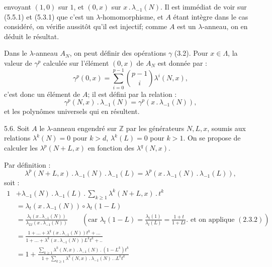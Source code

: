 
envoyant \((1,0)\) sur \(1\), et \((0,x)\) sur \(x\mathbin{.}\lambda_{-1}(N)\). Il est immédiat de voir sur (5.5.1) et (5.3.1) que c'est un \(\lambda\)-homomorphisme, et \(A\) étant intègre dans le cas considéré, on vérifie aussitôt qu'il est injectif; comme \(A\) est un \(\lambda\)-anneau, on en déduit le résultat.

Dans le \(\lambda\)-anneau \(A_N\), on peut définir des opérations \(\gamma\) (3.2). Pour \(x\in\Lambda\), la valeur de \(\gamma^p\) calculée sur l'élément \((0,x)\) de \(A_N\) est donnée par :
\[
  \gamma^p(0,x)=\sum_{i=0}^{p-1}\binom{p-1}{i}\lambda^i(N,x),
\]
c'est donc un élément de \(A\); il est défini par la relation :
\begin{equation}\tag{5.5.4}
  \gamma^p(N,x)\mathbin{.}\lambda_{-1}(N)=\gamma^p(x\mathbin{.}\lambda_{-1}(N)),
\end{equation}
et les polynômes universels qui en résultent.


5.6. Soit \(A\) le \(\lambda\)-anneau engendré sur \(\mathbb Z\) par les générateurs \(N,L,x\), soumis aux relations \(\lambda^k(N)=0\) pour \(k>d\), \(\lambda^k(L)=0\) pour \(k>1\). On se propose de calculer les \(\lambda^p(N+L,x)\) en fonction des \(\lambda^q(N,x)\).

Par définition :
\[
  \lambda^p(N+L,x)\mathbin{.}\lambda_{-1}(N)\mathbin{.}\lambda_{-1}(L)
  =\lambda^p(x\mathbin{.}\lambda_{-1}(N)\mathbin{.}\lambda_{-1}(L)),
\]
soit :
\[
\begin{aligned}
1&+\lambda_{-1}(N)\mathbin{.}\lambda_{-1}(L)\mathbin{.}\sum_{k\ge1}\lambda^k(N+L,x)\mathbin{.} t^k \\
 &=\lambda_t(x\mathbin{.}\lambda_{-1}(N))\circ \lambda_t(1-L) \\
 &=\frac{\lambda_t(x\mathbin{.}\lambda_{-1}(N))}{\lambda_{Lt}(x\mathbin{.}\lambda_{-1}(N))}
   \qquad\left(\text{car }\lambda_t(1-L)=\frac{\lambda_t(1)}{\lambda_t(L)}=\frac{1+t}{1+Lt}.\text{ et on applique }(2.3.2)\right) \\
 &=\frac{1+\ldots+\lambda^k(x\mathbin{.}\lambda_{-1}(N))t^k+\ldots}{1+\ldots+\lambda^k(x\mathbin{.}\lambda_{-1}(N))L^k t^k+..} \\
 &=1+\frac{\sum_{k\ge1}\lambda^k(N,x)\mathbin{.}\lambda_{-1}(N)\mathbin{.}(1-L^k)t^k}{1+\sum_{k\ge1}\lambda^k(N,x)\mathbin{.}\lambda_{-1}(N)\mathbin{.}\mathbin{.} L^k t^k}
\end{aligned}
\]
